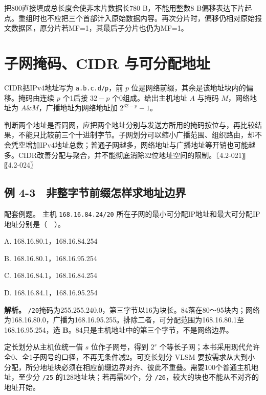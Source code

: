 把800直接填成总长度会使非末片数据长780 B，不能用整数8 B偏移表达下片起点。重组时也不应把三个首部计入原始数据内容。再次分片时，偏移仍相对原始报文数据区，原分片若MF=1，其最后子分片也仍为MF=1。

\section{子网掩码、CIDR 与可分配地址}\label{CN04-08}

CIDR把IPv4地址写为 \texttt{a.b.c.d/\allowbreak{}p}，前 \(p\) 位是网络前缀，其余是该地址块内的偏移。掩码由连续 \(p\) 个1后接 \(32-p\) 个0组成。给出主机地址 \(A\) 与掩码 \(M\)，网络地址为 \(A\&M\)，广播地址为网络地址加 \(2^{32-p}-1\)。

判断两个地址是否同网，应把两个地址分别与发送方所用的掩码按位与，再比较结果，不能只比较前三个十进制字节。子网划分可以缩小广播范围、组织路由，却不会凭空增加IPv4地址总数；普通子网越多，网络地址与广播地址等开销也可能越多。CIDR改善分配与聚合，并不能彻底消除32位地址空间的限制。〖4.2-021〗〖4.2-024〗

\subsection{例 4-3　非整字节前缀怎样求地址边界}\label{CN04-ex3}

\begin{example}[配套例题]

配套例题。 主机 \texttt{168.16.84.24/\allowbreak{}20} 所在子网的最小可分配IP地址和最大可分配IP地址分别是（　）。

A. 168.16.80.1，168.16.84.254

B. 168.16.80.1，168.16.95.254

C. 168.16.84.1，168.16.84.254

D. 168.16.84.1，168.16.95.254

\end{example}

\textbf{解析。} \texttt{/\allowbreak{}20}掩码为255.255.240.0，第三字节以16为块长。84落在80～95块内；网络为168.16.80.0，广播为168.16.95.255。排除二者，可分配范围为168.16.80.1至168.16.95.254，选 \textbf{B}。84只是主机地址中的第三个字节，不是网络边界。

定长划分从主机位统一借 \(s\) 位作子网号，得到 \(2^s\) 个等长子网；本书采用现代允许全0、全1子网号的口径，不再无条件减2。可变长划分 VLSM 要按需求从大到小分配，所分地址块必须在相应前缀边界对齐、彼此不重叠。需要100个普通主机地址，至少分 \texttt{/\allowbreak{}25} 的128地址块；若再需50个，分 \texttt{/\allowbreak{}26}，较大的块也不能从不对齐的地址开始。

